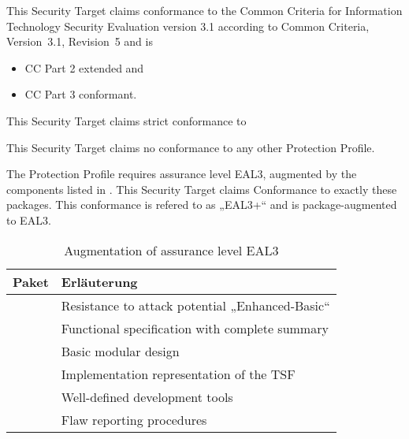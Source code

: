 

This Security Target claims conformance to the Common Criteria for
Information Technology Security Evaluation version 3.1 according to Common
Criteria, Version~3.1, Revision~5 and is

\begin{itemize}
\item CC Part 2 \autocite{CCPart2} extended and
\item CC Part 3 \autocite{CCPart3} conformant.
\end{itemize}


This Security Target claims strict conformance to


This Security Target claims no conformance to any other Protection
Profile.


The Protection Profile requires assurance level EAL3, augmented by the
components listed in . This Security Target claims
Conformance to exactly these packages. This conformance is refered to as „EAL3+“
and is package-augmented to EAL3.

\begin{table}[htbp]
  \centering
  \begin{tabularx}{0.7\textwidth}{@{}lY@{}}
    \toprule
    Paket & Erläuterung \\
    \midrule
     & Resistance to attack potential „Enhanced-Basic“\\
     & Functional specification with complete summary\\
     & Basic modular design\\
     & Implementation representation of the TSF\\
     & Well-defined development tools\\
     & Flaw reporting procedures\\
    \bottomrule
  \end{tabularx}
  \caption{Augmentation of assurance level EAL3}
  \label{tab:conf.eal3plus}
\end{table}

